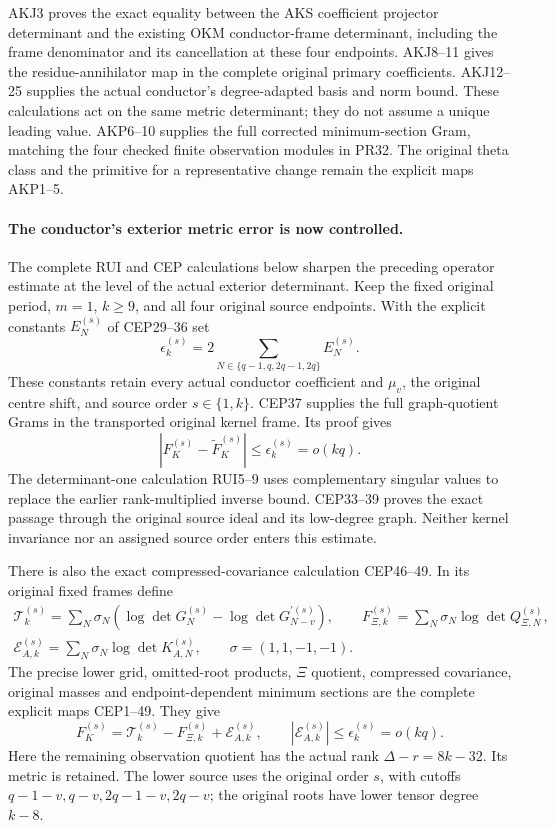 \documentclass[11pt,a4paper]{article}
\begin{document}
AKJ3 proves the exact equality between the AKS coefficient projector
determinant and the existing OKM conductor-frame determinant, including
the frame denominator and its cancellation at these four endpoints.
AKJ8--11 gives the residue-annihilator map in the complete original
primary coefficients. AKJ12--25 supplies the actual conductor's
degree-adapted basis and norm bound. These calculations act on the
same metric determinant; they do not assume a unique leading value.
AKP6--10 supplies the full corrected minimum-section Gram, matching
the four checked finite observation modules in PR32. The original
theta class and the primitive for a representative change remain
the explicit maps AKP1--5.


\paragraph{The conductor's exterior metric error is now controlled.}
The complete RUI and CEP calculations below sharpen the preceding
operator estimate at the level of the actual exterior determinant.
Keep the fixed original period, $m=1$, $k\ge9$, and all four original
source endpoints. With the explicit constants $E_N^{(s)}$ of
CEP29--36 set
\[
 \epsilon_k^{(s)}=2\sum_{N\in\{q-1,q,2q-1,2q\}}E_N^{(s)}.
 \tag{MRI4g}
\]
These constants retain every actual conductor coefficient and
$\mu_v$, the original centre shift, and source order $s\in\{1,k\}$.
CEP37 supplies the full graph-quotient Grams in the transported
original kernel frame. Its proof gives
\[
 \left|F_K^{(s)}-\widetilde F_K^{(s)}\right|
 \le\epsilon_k^{(s)}=o(kq).
 \tag{MRI4h}
\]
The determinant-one calculation RUI5--9 uses complementary singular
values to replace the earlier rank-multiplied inverse bound.
CEP33--39 proves the exact passage through the original source ideal
and its low-degree graph. Neither kernel invariance nor an assigned
source order enters this estimate.

There is also the exact compressed-covariance calculation CEP46--49.
In its original fixed frames define
\[
 \begin{gathered}
 \mathcal T_k^{(s)}=\sum_N\sigma_N
      (\log\det G_N^{(s)}-\log\det G_{N-v}^{\prime(s)}),\qquad
 F_{\Xi,k}^{(s)}=\sum_N\sigma_N\log\det Q_{\Xi,N}^{(s)},\\
 \mathcal E_{A,k}^{(s)}=\sum_N\sigma_N\log\det K_{A,N}^{(s)},
 \qquad\sigma=(1,1,-1,-1).
 \end{gathered}\tag{MRI4i}
\]
The precise lower grid, omitted-root products, $\Xi$ quotient,
compressed covariance, original masses and endpoint-dependent
minimum sections are the complete explicit maps CEP1--49. They give
\[
 F_K^{(s)}=\mathcal T_k^{(s)}-F_{\Xi,k}^{(s)}
                       +\mathcal E_{A,k}^{(s)},\qquad
 |\mathcal E_{A,k}^{(s)}|\le\epsilon_k^{(s)}=o(kq).
 \tag{MRI4j}
\]
Here the remaining observation quotient has the actual rank
$\Delta-r=8k-32$. Its metric is retained. The lower source uses
the original order $s$, with cutoffs $q-1-v,q-v,2q-1-v,2q-v$;
the original roots have lower tensor degree $k-8$.
\end{document}
